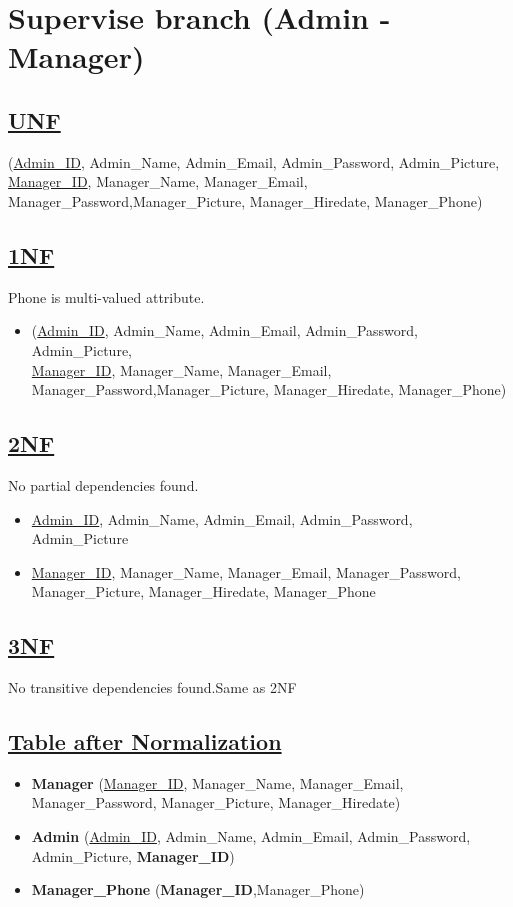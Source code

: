 \section{\texorpdfstring{\centering Supervise branch (Admin - Manager)}{Supervise branch (Admin - Manager)}}
\subsection*{\underline{UNF}}

(\underline{Admin\_ID}, Admin\_Name, Admin\_Email, Admin\_Password, Admin\_Picture,\\
\underline{Manager\_ID}, Manager\_Name, Manager\_Email, Manager\_Password,Manager\_Picture, Manager\_Hiredate, Manager\_Phone)

\subsection*{\underline{1NF}}
Phone is multi-valued attribute.
\vskip 0.2in

\begin{itemize}
    \item (\underline{Admin\_ID}, Admin\_Name, Admin\_Email, Admin\_Password, Admin\_Picture,\\
          \underline{Manager\_ID}, Manager\_Name, Manager\_Email, Manager\_Password,Manager\_Picture, Manager\_Hiredate, Manager\_Phone)
\end{itemize}

\subsection*{\underline{2NF}}
No partial dependencies found.
\vskip 0.2in

\begin{itemize}
    \item \underline{Admin\_ID}, Admin\_Name, Admin\_Email, Admin\_Password, Admin\_Picture
    \item \underline{Manager\_ID}, Manager\_Name, Manager\_Email, Manager\_Password, Manager\_Picture, Manager\_Hiredate, Manager\_Phone
\end{itemize}

\subsection*{\underline{3NF}}
No transitive dependencies found.Same as 2NF

\subsection*{\underline{Table after Normalization}}
\vskip 0.2in
\begin{itemize}
    \item \textbf{Manager} (\underline{Manager\_ID}, Manager\_Name, Manager\_Email, Manager\_Password, Manager\_Picture, Manager\_Hiredate)
    \item \textbf{Admin} (\underline{Admin\_ID}, Admin\_Name, Admin\_Email, Admin\_Password, Admin\_Picture, \textbf{Manager\_ID})
    \item \textbf{Manager\_Phone} (\textbf{Manager\_ID},{Manager\_Phone})
\end{itemize}

\clearpage